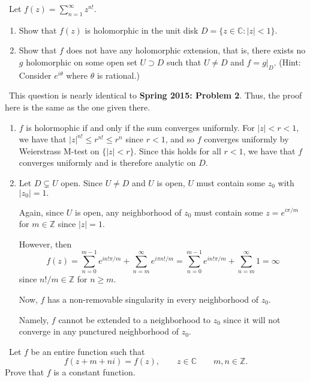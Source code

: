 \documentclass[12pt]{Homework}
\begin{document}
\begin{problem} $\,$
Let $f(z)=\sum_{n=1}^\infty z^{n!}$. 
\begin{enumerate}[label=(\alph*)]
    \item Show that $f(z)$ is holomorphic in the unit disk $D=\{z\in\mathbb{C}:|z|<1\}$.
    \item Show that $f$ does not have any holomorphic extension, that is, there exists no $g$ holomorphic on some open set $U\supset D$ such that $U\not=D$ and $f=g|_D$. (Hint: Consider $e^{i\theta}$ where $\theta$ is rational.)
\end{enumerate}
\end{problem}


\begin{solution}$\,$
This question is nearly identical to \textbf{Spring 2015: Problem 2}. Thus, the proof here is the same as the one given there.
\begin{enumerate}[label=(\alph*)]
    \item $f$ is holormophic if and only if the sum converges uniformly. For $|z|<r<1$, we have that $|z|^{n!}\le r^{n!}\le r^n$ since $r<1$, and so $f$ converges uniformly by Weierstrass M-test on $\{|z|<r\}.$ Since this holds for all $r<1$, we have that $f$ converges uniformly and is therefore analytic on $D.$
    \item Let $D\subsetneq U$ open. Since $U\not=D$ and $U$ is open, $U$ must contain some $z_0$ with $|z_0|=1.$ 
    
    Again, since $U$ is open, any neighborhood of $z_0$ must contain some $z=e^{i\pi/m}$ for $m\in\mathbb{Z}$ since $|z|=1.$
    
    However, then $$f(z)=\sum_{n=0}^{m-1}e^{in!\pi/m}+\sum_{n=m}^\infty e^{i\pi n!/m}=\sum_{n=0}^{m-1}e^{in!\pi/m}+\sum_{n=m}^\infty 1=\infty$$ since $n!/m\in\mathbb{Z}$ for $n\ge m.$ 
    
    Now, $f$ has a non-removable singularity in every neighborhood of $z_0$.
    
    Namely, $f$ cannot be extended to a neighborhood to $z_0$ since it will not converge in any punctured neighborhood of $z_0.$
\end{enumerate}
\end{solution}
\newpage





\begin{problem} $\,$
Let $f$ be an entire function such that $$f(z+m+ni)=f(z),\qquad z\in\mathbb{C}\qquad m,n\in\mathbb{Z}.$$ Prove that $f$ is a constant function.
\end{problem}
\end{document}
